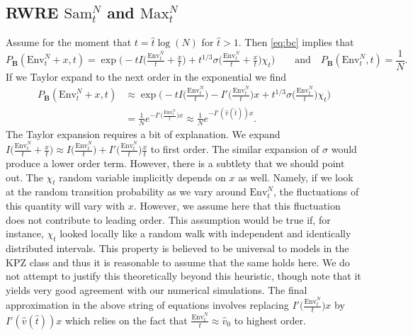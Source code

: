 \documentclass[letter,reqno, 11pt, oneside]{amsart}
\newcommand{\envnt}{\text{Env}_t^N}
\def\maxnt{\mathrm{Max}^{N}_t}
\def\snt{\mathrm{Sam}^{N}_t}
\begin{document}
\subsection{RWRE $\snt$ and $\maxnt$}\label{sec:RWRE_Sam}
Assume for the moment that $t= \hat{t}\log(N)$ for $\hat{t}>1$. Then \eqref{eq:bc} implies that
$$
P_{\mathbf{B}}( \envnt + x,t) =\exp\Big(-tI\big(\tfrac{\envnt}{t} +\tfrac{x}{t}\big) + t^{1/3}\sigma\big(\tfrac{\envnt}{t} +\tfrac{x}{t}\big)\chi_t\Big)\qquad \textrm{and} \quad P_{\mathbf{B}}( \envnt,t) = \frac{1}{N}.
$$
If we Taylor expand to the next order in the exponential we find
\begin{align*}
P_{\mathbf{B}}( \envnt + x,t)&\approx \exp\Big(-tI\big(\tfrac{\envnt}{t}\big)-I'\big(\tfrac{\envnt}{t}\big)x + t^{1/3}\sigma\big(\tfrac{\envnt}{t}\big)\chi_t\Big)\\
&=\frac{1}{N} e^{-I'\big(\tfrac{\envnt}{t}\big)x} \approx\frac{1}{N}  e^{-I'(\hat{v}(\hat{t}))x}.
\end{align*}
The Taylor expansion requires a bit of explanation. We expand $I\big(\tfrac{\envnt}{t} +\tfrac{x}{t}\big) \approx I\big(\tfrac{\envnt}{t}\big) + I'\big(\tfrac{\envnt}{t}\big) \tfrac{x}{t}$ to first order. The similar expansion of $\sigma$ would produce a lower order term. However, there is a subtlety that we should point out. The $\chi_t$ random variable implicitly depends on $x$ as well. Namely, if we look at the random transition probability as we vary around $\envnt$, the fluctuations of this quantity will vary with $x$. However, we assume here that this fluctuation does not contribute to leading order. This assumption would be true if, for instance, $\chi_t$ looked locally like a random walk with independent and identically distributed intervals. This property is believed to be universal to models in the KPZ class and thus it is reasonable to assume that the same holds here. We do not attempt to justify this theoretically beyond this heuristic, though note that it yields very good agreement with our numerical simulations. The final approximation in the above string of equations involves replacing $I'\big(\tfrac{\envnt}{t}\big)x$ by $I'(\hat{v}(\hat{t}))x$ which relies on the fact that $\tfrac{\envnt}{t}\approx \hat{v}_0$ to highest order.
\end{document}
